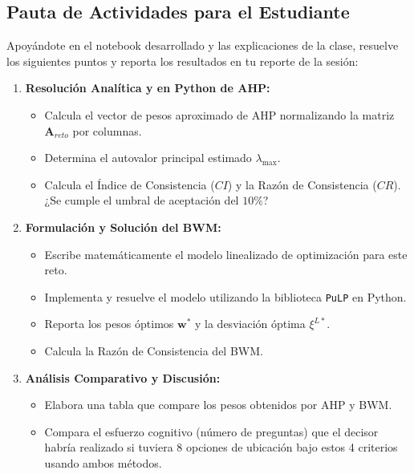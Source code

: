 \documentclass[11pt, letterpaper]{article}
\begin{document}
\subsection{Pauta de Actividades para el Estudiante}
Apoyándote en el notebook desarrollado y las explicaciones de la clase, resuelve los siguientes puntos y reporta los resultados en tu reporte de la sesión:
\begin{enumerate}
    \item \textbf{Resolución Analítica y en Python de AHP:}
          \begin{itemize}
              \item Calcula el vector de pesos aproximado de AHP normalizando la matriz $\mathbf{A}_{reto}$ por columnas.
              \item Determina el autovalor principal estimado $\lambda_{\max}$.
              \item Calcula el Índice de Consistencia ($CI$) y la Razón de Consistencia ($CR$). ¿Se cumple el umbral de aceptación del $10\%$?
          \end{itemize}
    \item \textbf{Formulación y Solución del BWM:}
          \begin{itemize}
              \item Escribe matemáticamente el modelo linealizado de optimización para este reto.
              \item Implementa y resuelve el modelo utilizando la biblioteca \texttt{PuLP} en Python.
              \item Reporta los pesos óptimos $\mathbf{w}^*$ y la desviación óptima $\xi^{L*}$.
              \item Calcula la Razón de Consistencia del BWM.
          \end{itemize}
    \item \textbf{Análisis Comparativo y Discusión:}
          \begin{itemize}
              \item Elabora una tabla que compare los pesos obtenidos por AHP y BWM.
              \item Compara el esfuerzo cognitivo (número de preguntas) que el decisor habría realizado si tuviera 8 opciones de ubicación bajo estos 4 criterios usando ambos métodos.
          \end{itemize}
\end{enumerate}
\end{document}
